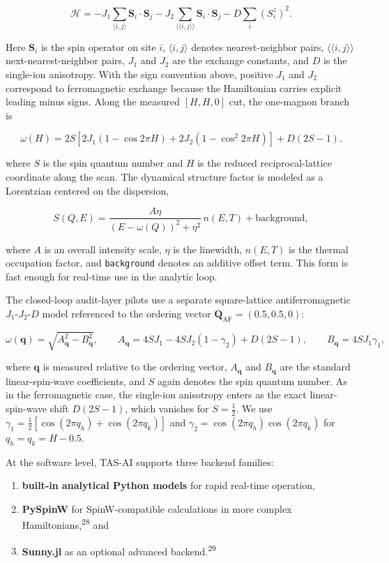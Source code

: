 \documentclass[
]{article}
\providecommand{\tightlist}{%
  \setlength{\itemsep}{0pt}\setlength{\parskip}{0pt}}
\begin{document}
\[
\mathcal H = -J_1\sum_{\langle i,j\rangle}\mathbf S_i\cdot \mathbf S_j
            -J_2\sum_{\langle\langle i,j\rangle\rangle}\mathbf S_i\cdot \mathbf S_j
            -D\sum_i (S_i^z)^2.
\]

Here \(\mathbf S_i\) is the spin operator on site \(i\),
\(\langle i,j\rangle\) denotes nearest-neighbor pairs,
\(\langle\langle i,j\rangle\rangle\) next-nearest-neighbor pairs,
\(J_1\) and \(J_2\) are the exchange constants, and \(D\) is the
single-ion anisotropy. With the sign convention above, positive \(J_1\)
and \(J_2\) correspond to ferromagnetic exchange because the Hamiltonian
carries explicit leading minus signs. Along the measured \([H,H,0]\)
cut, the one-magnon branch is

\[
\omega(H) = 2S\left[2J_1(1-\cos 2\pi H) + 2J_2(1-\cos^2 2\pi H)\right] + D(2S-1).
\]

where \(S\) is the spin quantum number and \(H\) is the reduced
reciprocal-lattice coordinate along the scan. The dynamical structure
factor is modeled as a Lorentzian centered on the dispersion,

\[
S(Q,E)=\frac{A\eta}{(E-\omega(Q))^2+\eta^2}\,n(E,T)+\mathrm{background},
\]

where \(A\) is an overall intensity scale, \(\eta\) is the linewidth,
\(n(E,T)\) is the thermal occupation factor, and \texttt{background}
denotes an additive offset term. This form is fast enough for real-time
use in the analytic loop.

The closed-loop audit-layer pilots use a separate square-lattice
antiferromagnetic \(J_1\)-\(J_2\)-\(D\) model referenced to the ordering
vector \(\mathbf Q_{\mathrm{AF}}=(0.5,0.5,0)\):

\[
\omega(\mathbf q)=\sqrt{A_{\mathbf q}^2-B_{\mathbf q}^2},
\qquad
A_{\mathbf q}=4SJ_1-4SJ_2(1-\gamma_2)+D(2S-1),
\qquad
B_{\mathbf q}=4SJ_1\gamma_1,
\]

where \(\mathbf q\) is measured relative to the ordering vector,
\(A_{\mathbf q}\) and \(B_{\mathbf q}\) are the standard
linear-spin-wave coefficients, and \(S\) again denotes the spin quantum
number. As in the ferromagnetic case, the single-ion anisotropy enters
as the exact linear-spin-wave shift \(D(2S-1)\), which vanishes for
\(S=\tfrac12\). We use
\(\gamma_1=\tfrac12[\cos(2\pi q_h)+\cos(2\pi q_k)]\) and
\(\gamma_2=\cos(2\pi q_h)\cos(2\pi q_k)\) for \(q_h=q_k=H-0.5\).

At the software level, TAS-AI supports three backend families:

\begin{enumerate}
\def\labelenumi{\arabic{enumi}.}
\tightlist
\item
  \textbf{built-in analytical Python models} for rapid real-time
  operation,
\item
  \textbf{PySpinW} for SpinW-compatible calculations in more complex
  Hamiltonians,\textsuperscript{28} and
\item
  \textbf{Sunny.jl} as an optional advanced backend.\textsuperscript{29}
\end{enumerate}
\end{document}
